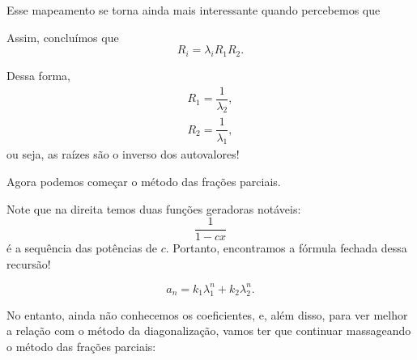 Esse mapeamento se torna ainda mais interessante quando percebemos que

\begin{calcproof}
\end{calcproof}

Assim, concluímos que
\[
  R_i = \lambda_i R_1 R_2.
\]

Dessa forma,
\begin{gather*}
  R_1 = \dfrac{1}{\lambda_2}, \\
  R_2 = \dfrac{1}{\lambda_1},
\end{gather*}
ou seja, as raízes são o inverso dos autovalores!

Agora podemos começar o método das frações parciais.

\begin{calcproof}
\end{calcproof}

Note que na direita temos duas funções geradoras notáveis:
\[
  \dfrac{1}{1 - cx}
\]
é a sequência das potências de $c$. Portanto, encontramos a fórmula fechada dessa recursão!

\[
  a_n = k_1 \lambda_1^n + k_2 \lambda_2^n.
\]

No entanto, ainda não conhecemos os coeficientes, e, além disso, para ver melhor a relação com o método da diagonalização, vamos ter que continuar massageando o método das frações parciais:

\begin{calcproof}
\end{calcproof}

